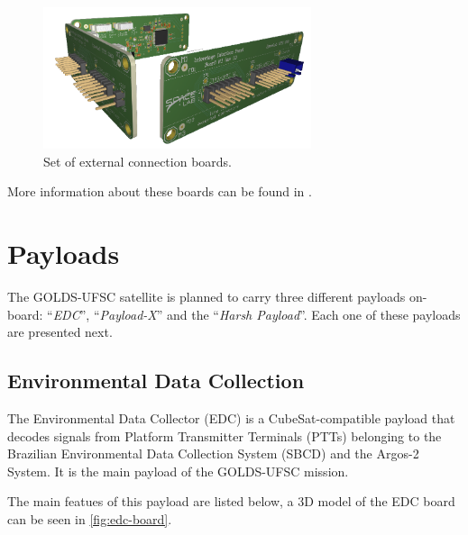 \begin{figure}[!ht]
    \begin{center}
        \includegraphics[width=0.7\textwidth]{figures/iip_fullset}
        \caption{Set of external connection boards.}
        \label{fig:iip-boards}
    \end{center}
\end{figure}

More information about these boards can be found in \cite{iip}.

\section{Payloads}

The GOLDS-UFSC satellite is planned to carry three different payloads on-board: ``\textit{EDC}'', ``\textit{Payload-X}'' and the ``\textit{Harsh Payload}''. Each one of these payloads are presented next.

\subsection{Environmental Data Collection}

The Environmental Data Collector (EDC) is a CubeSat-compatible payload that decodes signals from Platform Transmitter Terminals (PTTs) belonging to the Brazilian Environmental Data Collection System (SBCD) and the Argos-2 System. It is the main payload of the GOLDS-UFSC mission.

The main featues of this payload are listed below, a 3D model of the EDC board can be seen in \autoref{fig:edc-board}.

